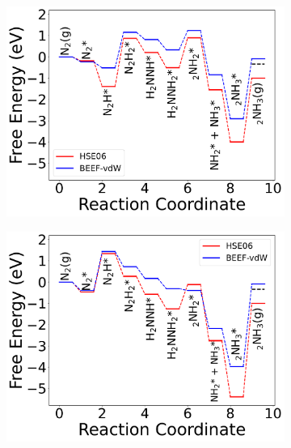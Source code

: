 \begin{figure}
    \centering
    \begin{subfigure}{0.31\columnwidth}
        \centering
        \includegraphics[width=\columnwidth]{figures/metal_oxide_figures/Figure 6a.pdf}
        \caption{}
        \label{fig:FED}
    \end{subfigure}
    \begin{subfigure}{0.31\columnwidth}
        \centering
        \includegraphics[width=\columnwidth]{figures/metal_oxide_figures/Figure 6b.pdf}
        \caption{}
        \label{fig:VBO_4_FED}
    \end{subfigure}
    \begin{subfigure}{0.31\columnwidth}

\end{subfigure}
\end{figure}
